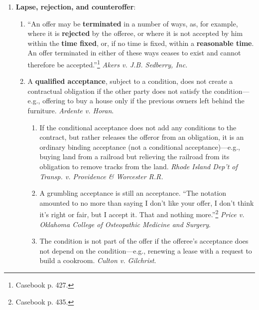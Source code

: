 \begin{enumerate}
\begin{enumerate}
        \item People are not legally bound when they make appointments or 
        reservations.\footnote{Casebook p. 424.}
    \end{enumerate}
    \item \textbf{Lapse, rejection, and counteroffer}:
    \begin{enumerate}
        \item ``An offer may be \textbf{terminated} in a number of ways, as, 
        for example, where it is \textbf{rejected} by the offeree, or where it 
        is not accepted by him within the \textbf{time fixed}, or, if no time 
        is fixed, within a \textbf{reasonable time}.  An offer terminated in 
        either of these ways ceases to exist and cannot therefore be 
        accepted.''\footnote{Casebook p. 427.} \emph{Akers v. J.B. Sedberry, 
        Inc.}
        \item A \textbf{qualified acceptance}, subject to a condition, does 
        not create a contractual obligation if the other party does not 
        satisfy the condition---e.g., offering to buy a house only if the 
        previous owners left behind the furniture. \emph{Ardente v. Horan}.
        \begin{enumerate}
            \item If the conditional acceptance does not add any conditions to 
            the contract, but rather releases the offeror from an obligation, 
            it is an ordinary binding acceptance (not a conditional 
            acceptance)---e.g., buying land from a railroad but relieving the 
            railroad from its obligation to remove tracks from the land. 
            \emph{Rhode Island Dep't of Transp. v.  Providence \& Worcester 
            R.R.}
            \item A grumbling acceptance is still an acceptance. ``The 
            notation amounted to no more than saying I don't like your offer, 
            I don't think it's right or fair, but I accept it. That and 
            nothing more.''\footnote{Casebook p. 435.} \emph{Price v. Oklahoma 
            College of Osteopathic Medicine and Surgery}.
            \item The condition is not part of the offer if the offeree's 
            acceptance does not depend on the condition---e.g., renewing a 
            lease with a request to build a cookroom. \emph{Culton v. 
            Gilchrist}.
        \end{enumerate}

\end{enumerate}
\end{enumerate}
